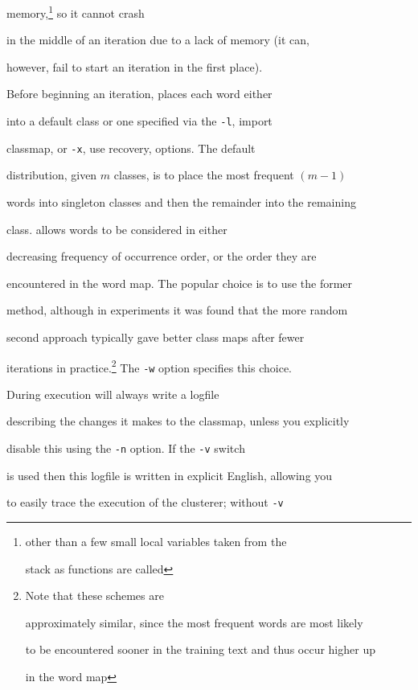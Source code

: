 memory,\footnote{other than a few small local variables taken from the


stack as functions are called} so it cannot crash


in the middle of an iteration due to a lack of memory (it can,


however, fail to start an iteration in the first place).





Before beginning an iteration,  places each word either


into a default class or one specified via the \texttt{-l}, import


classmap, or \texttt{-x}, use recovery, options.  The default


distribution, given $m$ classes, is to place the most frequent $(m-1)$


words into singleton classes and then the remainder into the remaining


class.   allows words to be considered in either


decreasing frequency of occurrence order, or the order they are


encountered in the word map.  The popular choice is to use the former


method, although in experiments it was found that the more random


second approach typically gave better class maps after fewer


iterations in practice.\footnote{Note that these schemes are


approximately similar, since the most frequent words are most likely


to be encountered sooner in the training text and thus occur higher up


in the word map} The \texttt{-w} option specifies this choice.





During execution  will always write a logfile


describing the changes it makes to the classmap, unless you explicitly


disable this using the \texttt{-n} option.  If the \texttt{-v} switch


is used then this logfile is written in explicit English, allowing you


to easily trace the execution of the clusterer; without \texttt{-v}


